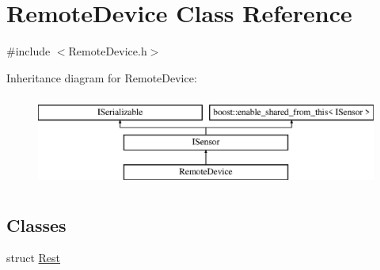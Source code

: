 \hypertarget{class_remote_device}{}\section{Remote\+Device Class Reference}
\label{class_remote_device}


{\ttfamily \#include $<$Remote\+Device.\+h$>$}

Inheritance diagram for Remote\+Device\+:\begin{figure}[H]
\begin{center}
\leavevmode
\includegraphics[height=3.000000cm]{class_remote_device}
\end{center}
\end{figure}
\subsection*{Classes}
\begin{DoxyCompactItemize}
\item 
struct \hyperlink{struct_remote_device_1_1_rest}{Rest}
\end{DoxyCompactItemize}
